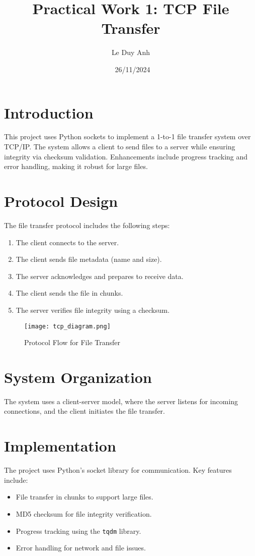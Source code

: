 \documentclass[a4paper,12pt]{article}
\title{Practical Work 1: TCP File Transfer}
\author{Le Duy Anh}
\date{\ 26/11/2024}
\begin{document}
\maketitle

\section{Introduction}
This project uses Python sockets to implement a 1-to-1 file transfer system over TCP/IP. 
The system allows a client to send files to a server while ensuring integrity via checksum validation.
Enhancements include progress tracking and error handling, making it robust for large files.

\section{Protocol Design}
The file transfer protocol includes the following steps:
\begin{enumerate}
    \item The client connects to the server.
    \item The client sends file metadata (name and size).
    \item The server acknowledges and prepares to receive data.
    \item The client sends the file in chunks.
    \item The server verifies file integrity using a checksum.
\end{enumerate}

\begin{figure}[H]
    \centering
    \texttt{[image: tcp\_diagram.png]}
    \caption{Protocol Flow for File Transfer}
\end{figure}

\section{System Organization}
The system uses a client-server model, where the server listens for incoming connections, 
and the client initiates the file transfer.

\section{Implementation}
The project uses Python’s socket library for communication. Key features include:
\begin{itemize}
    \item File transfer in chunks to support large files.
    \item MD5 checksum for file integrity verification.
    \item Progress tracking using the \texttt{tqdm} library.
    \item Error handling for network and file issues.
\end{itemize}
\end{document}
